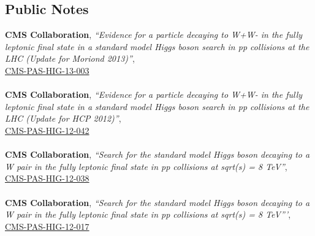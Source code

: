 \documentclass[margin]{res}
\begin{document}
\begin{resume}
\section{Public Notes}
\textbf{CMS Collaboration}, \textit{``Evidence for a particle decaying to W+W- in the fully leptonic final state in a standard model Higgs boson search in pp collisions at the LHC (Update for Moriond 2013)''}, \\
\href{http://cds.cern.ch/record/1523673/files/HIG-13-003-pas.pdf}{CMS-PAS-HIG-13-003} 
\\ 
\\
\textbf{CMS Collaboration}, \textit{``Evidence for a particle decaying to W+W- in the fully leptonic final state in a standard model Higgs boson search in pp collisions at the LHC (Update for HCP 2012)''}, \\ 
\href{http://cds.cern.ch/record/1493602/files/HIG-12-042-pas.pdf}{CMS-PAS-HIG-12-042}  
\\
\\
\textbf{CMS Collaboration}, \textit{``Search for the standard model Higgs boson decaying to a W pair in the fully leptonic final state in pp collisions at sqrt(s) = 8 TeV''}, \\
\href{http://cds.cern.ch/record/1478185/files/HIG-12-038-pas.pdf}{CMS-PAS-HIG-12-038} 
\\ 
\\
\textbf{CMS Collaboration}, \textit{``Search for the standard model Higgs boson decaying to a W pair in the fully leptonic final state in pp collisions at sqrt(s) = 8 TeV'''}, \\ 
\href{http://cds.cern.ch/record/1460424/files/HIG-12-017-pas.pdf}{CMS-PAS-HIG-12-017}  




\end{resume}
\end{document}
